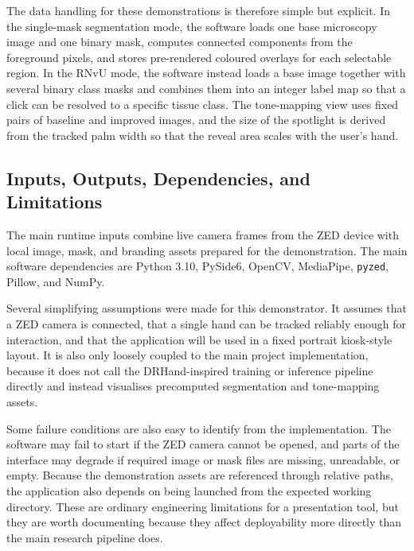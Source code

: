 ﻿\documentclass[11pt,a4paper]{article}
\begin{document}
\medskip

The data handling for these demonstrations is therefore simple but explicit. In
the single-mask segmentation mode, the software loads one base microscopy image
and one binary mask, computes connected components from the foreground pixels,
and stores pre-rendered coloured overlays for each selectable region. In the
RNvU mode, the software instead loads a base image together with several
binary class masks and combines them into an integer label map so that a click
can be resolved to a specific tissue class. The tone-mapping view uses fixed
pairs of baseline and improved images, and the size of the spotlight is
derived from the tracked palm width so that the reveal area scales with the
user's hand.

\subsection{Inputs, Outputs, Dependencies, and Limitations}

The main runtime inputs combine live camera frames from the ZED device with
local image, mask, and branding assets prepared for the demonstration.
The main software dependencies are Python 3.10, PySide6, OpenCV, MediaPipe,
\texttt{pyzed}, Pillow, and NumPy.

\medskip

Several simplifying assumptions were made for this demonstrator. It assumes
that a ZED camera is connected, that a single hand can be tracked reliably
enough for interaction, and that the application will be used in a fixed
portrait kiosk-style layout. It is also only loosely coupled to the main
project implementation, because it does not call the DRHand-inspired training
or inference pipeline directly and instead visualises precomputed segmentation
and tone-mapping assets.

\medskip

Some failure conditions are also easy to identify from the implementation. The
software may fail to start if the ZED camera cannot be opened, and parts of the
interface may degrade if required image or mask files are missing, unreadable,
or empty. Because the demonstration assets are referenced through relative
paths, the application also depends on being launched from the expected working
directory. These are ordinary engineering limitations for a presentation tool,
but they are worth documenting because they affect deployability more directly
than the main research pipeline does.
\end{document}
